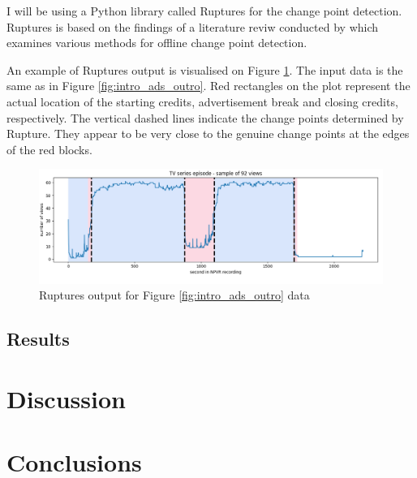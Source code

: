 I will be using a Python library called Ruptures for the change point detection. Ruptures is based on the findings of a literature reviw conducted by \cite{truongSelectiveReviewOffline2020} which examines various methods for offline change point detection.

An example of Ruptures output is visualised on Figure \ref{fig:ruptures_change_detection}. The input data is the same as in Figure \ref{fig:intro_ads_outro}. Red rectangles on the plot represent the actual location of the starting credits, advertisement break and closing credits, respectively. The vertical dashed lines indicate the change points determined by Rupture. They appear to be very close to the genuine change points at the edges of the red blocks.

\begin{figure}[H]
\centering
\includegraphics[width=1\textwidth]{../plots/episode-pen100.png}
\caption{Ruptures output for Figure \ref{fig:intro_ads_outro} data}
\label{fig:ruptures_change_detection}
\end{figure}

\subsection{Results} \label{sec:results}

\section{Discussion} \label{sec:discussion}

\section{Conclusions} \label{sec:conclusions}
